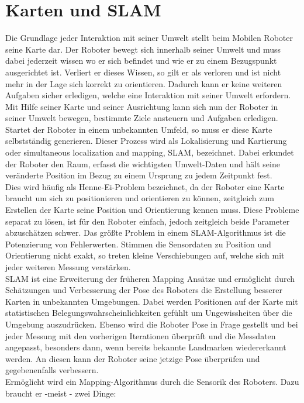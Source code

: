 \documentclass[twoside,11pt, a4paper]{report}
\begin{document}
	\section{Karten und SLAM }
	Die Grundlage jeder Interaktion mit seiner Umwelt stellt beim Mobilen Roboter seine Karte dar. Der Roboter bewegt sich innerhalb seiner Umwelt und muss dabei jederzeit wissen wo er sich befindet und wie er zu einem Bezugspunkt ausgerichtet ist. Verliert er dieses Wissen, so gilt er als verloren und ist nicht mehr in der Lage sich korrekt zu orientieren. Dadurch kann er keine weiteren Aufgaben sicher erledigen, welche eine Interaktion mit seiner Umwelt erfordern. \\
	Mit Hilfe seiner Karte und seiner Ausrichtung kann sich nun der Roboter  in seiner Umwelt bewegen, bestimmte Ziele ansteuern und Aufgaben erledigen. Startet der Roboter in einem unbekannten Umfeld, so muss er diese Karte selbstständig generieren. Dieser Prozess wird als Lokalisierung und Kartierung oder simultaneous localization and mapping, SLAM, bezeichnet. Dabei erkundet der Roboter den Raum, erfasst die wichtigsten Umwelt-Daten und hält seine veränderte Position im Bezug zu einem Ursprung zu jedem Zeitpunkt fest. \\
	Dies wird häufig als Henne-Ei-Problem bezeichnet, da der Roboter eine Karte braucht um sich zu positionieren und orientieren zu können, zeitgleich zum Erstellen der Karte seine Position und Orientierung kennen muss. Diese Probleme separat zu lösen, ist für den Roboter einfach, jedoch zeitgleich beide Parameter abzuschätzen schwer. Das größte Problem in einem SLAM-Algorithmus ist die Potenzierung von Fehlerwerten. Stimmen die Sensordaten zu Position und Orientierung nicht exakt, so treten kleine Verschiebungen auf, welche sich mit jeder weiteren Messung verstärken. \\
	SLAM ist eine Erweiterung der früheren Mapping Ansätze und ermöglicht durch Schätzungen und Verbesserung der Pose des Roboters die Erstellung besserer Karten in unbekannten Umgebungen. Dabei werden Positionen auf der Karte mit statistischen Belegungswahrscheinlichkeiten gefühlt um Ungewissheiten über die Umgebung auszudrücken. Ebenso wird die Roboter Pose in Frage gestellt und bei jeder Messung mit den vorherigen Iterationen überprüft und die Messdaten angepasst, besonders dann, wenn bereits bekannte Landmarken wiedererkannt werden. An diesen kann der Roboter seine jetzige Pose überprüfen und gegebenenfalls verbessern. \\
	Ermöglicht wird ein Mapping-Algorithmus durch die Sensorik des Roboters. Dazu braucht er -meist - zwei Dinge: 
\end{document}
